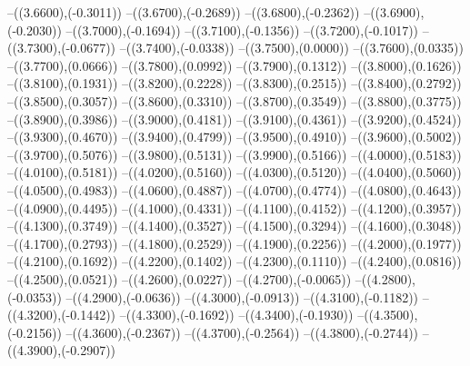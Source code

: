 {	--({\sx*(3.6600)},{\sy*(-0.3011)})
	--({\sx*(3.6700)},{\sy*(-0.2689)})
	--({\sx*(3.6800)},{\sy*(-0.2362)})
	--({\sx*(3.6900)},{\sy*(-0.2030)})
	--({\sx*(3.7000)},{\sy*(-0.1694)})
	--({\sx*(3.7100)},{\sy*(-0.1356)})
	--({\sx*(3.7200)},{\sy*(-0.1017)})
	--({\sx*(3.7300)},{\sy*(-0.0677)})
	--({\sx*(3.7400)},{\sy*(-0.0338)})
	--({\sx*(3.7500)},{\sy*(0.0000)})
	--({\sx*(3.7600)},{\sy*(0.0335)})
	--({\sx*(3.7700)},{\sy*(0.0666)})
	--({\sx*(3.7800)},{\sy*(0.0992)})
	--({\sx*(3.7900)},{\sy*(0.1312)})
	--({\sx*(3.8000)},{\sy*(0.1626)})
	--({\sx*(3.8100)},{\sy*(0.1931)})
	--({\sx*(3.8200)},{\sy*(0.2228)})
	--({\sx*(3.8300)},{\sy*(0.2515)})
	--({\sx*(3.8400)},{\sy*(0.2792)})
	--({\sx*(3.8500)},{\sy*(0.3057)})
	--({\sx*(3.8600)},{\sy*(0.3310)})
	--({\sx*(3.8700)},{\sy*(0.3549)})
	--({\sx*(3.8800)},{\sy*(0.3775)})
	--({\sx*(3.8900)},{\sy*(0.3986)})
	--({\sx*(3.9000)},{\sy*(0.4181)})
	--({\sx*(3.9100)},{\sy*(0.4361)})
	--({\sx*(3.9200)},{\sy*(0.4524)})
	--({\sx*(3.9300)},{\sy*(0.4670)})
	--({\sx*(3.9400)},{\sy*(0.4799)})
	--({\sx*(3.9500)},{\sy*(0.4910)})
	--({\sx*(3.9600)},{\sy*(0.5002)})
	--({\sx*(3.9700)},{\sy*(0.5076)})
	--({\sx*(3.9800)},{\sy*(0.5131)})
	--({\sx*(3.9900)},{\sy*(0.5166)})
	--({\sx*(4.0000)},{\sy*(0.5183)})
	--({\sx*(4.0100)},{\sy*(0.5181)})
	--({\sx*(4.0200)},{\sy*(0.5160)})
	--({\sx*(4.0300)},{\sy*(0.5120)})
	--({\sx*(4.0400)},{\sy*(0.5060)})
	--({\sx*(4.0500)},{\sy*(0.4983)})
	--({\sx*(4.0600)},{\sy*(0.4887)})
	--({\sx*(4.0700)},{\sy*(0.4774)})
	--({\sx*(4.0800)},{\sy*(0.4643)})
	--({\sx*(4.0900)},{\sy*(0.4495)})
	--({\sx*(4.1000)},{\sy*(0.4331)})
	--({\sx*(4.1100)},{\sy*(0.4152)})
	--({\sx*(4.1200)},{\sy*(0.3957)})
	--({\sx*(4.1300)},{\sy*(0.3749)})
	--({\sx*(4.1400)},{\sy*(0.3527)})
	--({\sx*(4.1500)},{\sy*(0.3294)})
	--({\sx*(4.1600)},{\sy*(0.3048)})
	--({\sx*(4.1700)},{\sy*(0.2793)})
	--({\sx*(4.1800)},{\sy*(0.2529)})
	--({\sx*(4.1900)},{\sy*(0.2256)})
	--({\sx*(4.2000)},{\sy*(0.1977)})
	--({\sx*(4.2100)},{\sy*(0.1692)})
	--({\sx*(4.2200)},{\sy*(0.1402)})
	--({\sx*(4.2300)},{\sy*(0.1110)})
	--({\sx*(4.2400)},{\sy*(0.0816)})
	--({\sx*(4.2500)},{\sy*(0.0521)})
	--({\sx*(4.2600)},{\sy*(0.0227)})
	--({\sx*(4.2700)},{\sy*(-0.0065)})
	--({\sx*(4.2800)},{\sy*(-0.0353)})
	--({\sx*(4.2900)},{\sy*(-0.0636)})
	--({\sx*(4.3000)},{\sy*(-0.0913)})
	--({\sx*(4.3100)},{\sy*(-0.1182)})
	--({\sx*(4.3200)},{\sy*(-0.1442)})
	--({\sx*(4.3300)},{\sy*(-0.1692)})
	--({\sx*(4.3400)},{\sy*(-0.1930)})
	--({\sx*(4.3500)},{\sy*(-0.2156)})
	--({\sx*(4.3600)},{\sy*(-0.2367)})
	--({\sx*(4.3700)},{\sy*(-0.2564)})
	--({\sx*(4.3800)},{\sy*(-0.2744)})
	--({\sx*(4.3900)},{\sy*(-0.2907)})
}
